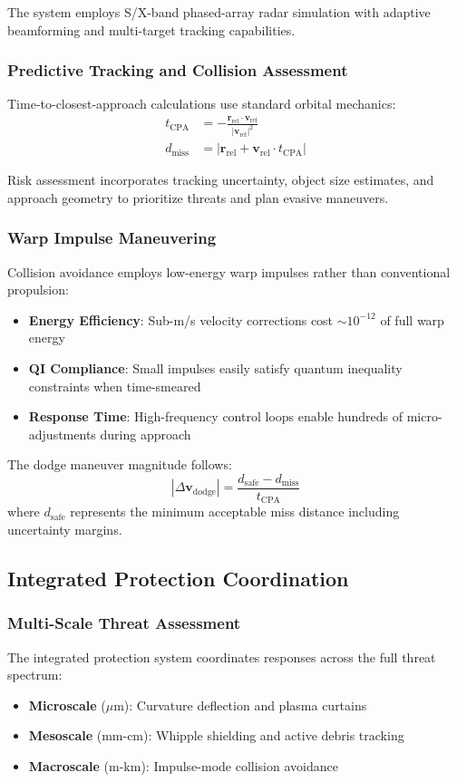 The system employs S/X-band phased-array radar simulation with adaptive beamforming and multi-target tracking capabilities.

\subsubsection{Predictive Tracking and Collision Assessment}
Time-to-closest-approach calculations use standard orbital mechanics:
\begin{align}
t_{\text{CPA}} &= -\frac{\mathbf{r}_{\text{rel}} \cdot \mathbf{v}_{\text{rel}}}{|\mathbf{v}_{\text{rel}}|^2} \\
d_{\text{miss}} &= |\mathbf{r}_{\text{rel}} + \mathbf{v}_{\text{rel}} \cdot t_{\text{CPA}}|
\end{align}

Risk assessment incorporates tracking uncertainty, object size estimates, and approach geometry to prioritize threats and plan evasive maneuvers.

\subsubsection{Warp Impulse Maneuvering}
Collision avoidance employs low-energy warp impulses rather than conventional propulsion:
\begin{itemize}
\item \textbf{Energy Efficiency}: Sub-m/s velocity corrections cost $\sim 10^{-12}$ of full warp energy
\item \textbf{QI Compliance}: Small impulses easily satisfy quantum inequality constraints when time-smeared
\item \textbf{Response Time}: High-frequency control loops enable hundreds of micro-adjustments during approach
\end{itemize}

The dodge maneuver magnitude follows:
\begin{equation}
|\Delta \mathbf{v}_{\text{dodge}}| = \frac{d_{\text{safe}} - d_{\text{miss}}}{t_{\text{CPA}}}
\end{equation}
where $d_{\text{safe}}$ represents the minimum acceptable miss distance including uncertainty margins.

\subsection{Integrated Protection Coordination}

\subsubsection{Multi-Scale Threat Assessment}
The integrated protection system coordinates responses across the full threat spectrum:
\begin{itemize}
\item \textbf{Microscale} ($\mu$m): Curvature deflection and plasma curtains
\item \textbf{Mesoscale} (mm-cm): Whipple shielding and active debris tracking  
\item \textbf{Macroscale} (m-km): Impulse-mode collision avoidance
\end{itemize}


